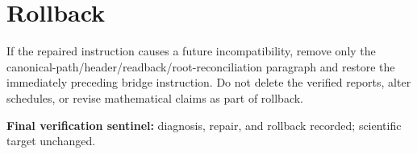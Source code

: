 \documentclass[11pt]{article}
\begin{document}
\section*{Rollback}
If the repaired instruction causes a future incompatibility, remove only the
canonical-path/header/readback/root-reconciliation paragraph and restore the
immediately preceding bridge instruction.  Do not delete the verified
reports, alter schedules, or revise mathematical claims as part of rollback.

\noindent\textbf{Final verification sentinel:} diagnosis, repair, and
rollback recorded; scientific target unchanged.
\end{document}
